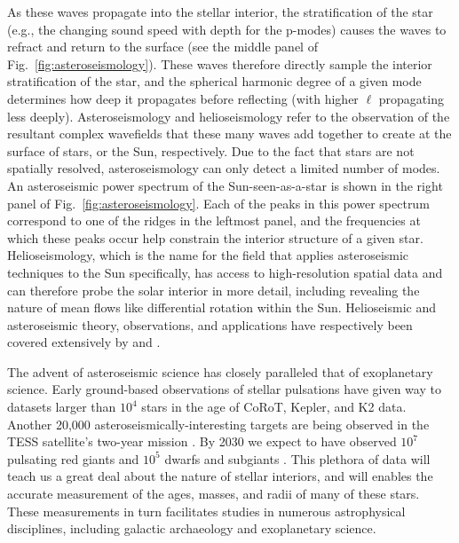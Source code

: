 As these waves propagate into the stellar interior, the stratification of the star (e.g., the changing sound speed with depth for the p-modes) causes the waves to refract and return to the surface (see the middle panel of Fig.~\ref{fig:asteroseismology}).
These waves therefore directly sample the interior stratification of the star, and the spherical harmonic degree of a given mode determines how deep it propagates before reflecting (with higher $\ell$ propagating less deeply).
Asteroseismology and helioseismology refer to the observation of the resultant complex wavefields that these many waves add together to create at the surface of stars, or the Sun, respectively.
Due to the fact that stars are not spatially resolved, asteroseismology can only detect a limited number of modes.
An asteroseismic power spectrum of the Sun-seen-as-a-star is shown in the right panel of Fig.~\ref{fig:asteroseismology}.
Each of the peaks in this power spectrum correspond to one of the ridges in the leftmost panel, and the frequencies at which these peaks occur help constrain the interior structure of a given star.
Helioseismology, which is the name for the field that applies asteroseismic techniques to the Sun specifically, has access to high-resolution spatial data and can therefore probe the solar interior in more detail, including revealing the nature of mean flows like differential rotation within the Sun.
Helioseismic and asteroseismic theory, observations, and applications have respectively been covered extensively by \cite{christensen-dalsgaard2002} and \cite{aerts&all2010}.

The advent of asteroseismic science has closely paralleled that of exoplanetary science.
Early ground-based observations of stellar pulsations \cite[e.g.,][]{kjeldsen&frandsen1991, bouchy&carrier2001, bedding&all2001} have given way to datasets larger than $10^4$ stars \cite[e.g.,][]{yu&all2018, santos&all2019b} in the age of CoRoT, Kepler, and K2 data.
Another 20,000 asteroseismically-interesting targets are being observed in the TESS satellite's two-year mission \citep{schofield&all2019}.
By 2030 we expect to have observed $10^7$ pulsating red giants and $10^5$ dwarfs and subgiants \citep{huber&all2019}.
This plethora of data will teach us a great deal about the nature of stellar interiors, and will enables the accurate measurement of the ages, masses, and radii of many of these stars.
These measurements in turn facilitates studies in numerous astrophysical disciplines, including galactic archaeology and exoplanetary science.

